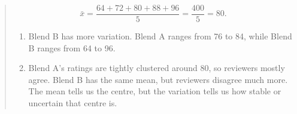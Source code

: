 \documentclass[
  letterpaper,
  DIV=11,
  numbers=noendperiod]{scrreprt}
\begin{document}
\begin{tcolorbox}
\begin{quote}
\[
\bar{x}
=
\frac{64 + 72 + 80 + 88 + 96}{5}
=
\frac{400}{5}
=
80.
\]

\begin{enumerate}
\def\labelenumi{\alph{enumi}.}
\setcounter{enumi}{2}
\item
  Blend B has more variation. Blend A ranges from 76 to 84, while Blend
  B ranges from 64 to 96.
\item
  Blend A's ratings are tightly clustered around 80, so reviewers mostly
  agree. Blend B has the same mean, but reviewers disagree much more.
  The mean tells us the centre, but the variation tells us how stable or
  uncertain that centre is.
\end{enumerate}
\end{quote}

\end{tcolorbox}
\end{document}
